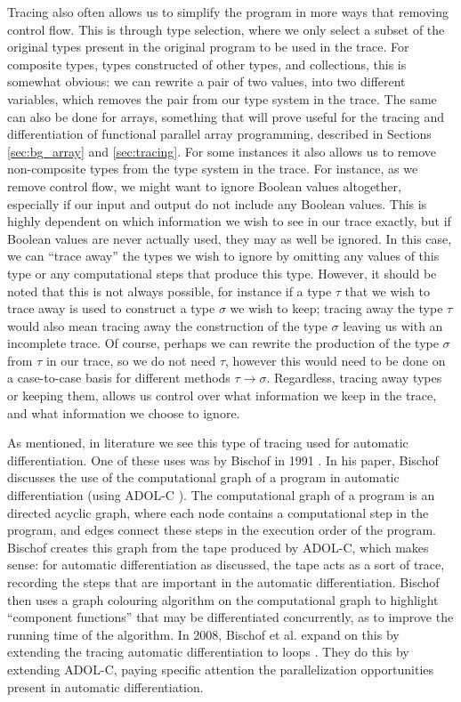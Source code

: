         Tracing also often allows us to simplify the program in more ways that removing control flow.
        This is through type selection, where we only select a subset of the original types present in the original program to be used in the trace.
        For composite types, types constructed of other types, and collections, this is somewhat obvious: we can rewrite a pair of two values, into two different variables, which removes the pair from our type system in the trace.
        The same can also be done for arrays, something that will prove useful for the tracing and differentiation of functional parallel array programming, described in Sections \ref{sec:bg_array} and \ref{sec:tracing}.
        For some instances it also allows us to remove non-composite types from the type system in the trace.
        For instance, as we remove control flow, we might want to ignore Boolean values altogether, especially if our input and output do not include any Boolean values.
        This is highly dependent on which information we wish to see in our trace exactly, but if Boolean values are never actually used, they may as well be ignored.
        In this case, we can ``trace away'' the types we wish to ignore by omitting any values of this type or any computational steps that produce this type.
        However, it should be noted that this is not always possible, for instance if a type $\tau$ that we wish to trace away is used to construct a type $\sigma$ we wish to keep; tracing away the type $\tau$ would also mean tracing away the construction of the type $\sigma$ leaving us with an incomplete trace.
        Of course, perhaps we can rewrite the production of the type $\sigma$ from $\tau$ in our trace, so we do not need $\tau$, however this would need to be done on a case-to-case basis for different methods $\tau\to\sigma$.
        Regardless, tracing away types or keeping them, allows us control over what information we keep in the trace, and what information we choose to ignore.

        As mentioned, in literature we see this type of tracing used for automatic differentiation.
        One of these uses was by Bischof in 1991 \cite{bischof1991issues}.
        In his paper, Bischof discusses the use of the computational graph of a program in automatic differentiation (using ADOL-C \cite{griewank1996algorithm}).
        The computational graph of a program is an directed acyclic graph, where each node contains a computational step in the program, and edges connect these steps in the execution order of the program.
        Bischof creates this graph from the tape produced by ADOL-C, which makes sense: for automatic differentiation as discussed, the tape acts as a sort of trace, recording the steps that are important in the automatic differentiation.
        Bischof then uses a graph colouring algorithm on the computational graph to highlight ``component functions'' that may be differentiated concurrently, as to improve the running time of the algorithm.
        In 2008, Bischof et al. expand on this by extending the tracing automatic differentiation to loops \cite{bischof2008parallel}.
        They do this by extending ADOL-C, paying specific attention the parallelization opportunities present in automatic differentiation.

